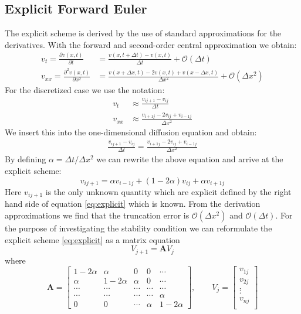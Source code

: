 \documentclass[%
 reprint,
nofootinbib,
aps,
]{revtex4-1}
\renewcommand{\vec}[1]{\mathbf{#1}} %
\begin{document}
\subsection{Explicit Forward Euler}
The explicit scheme is derived by the use of standard approximations for the derivatives. With the forward and second-order central approximation we obtain:
\begin{align*}
    v_t = \frac{\partial v(x,t)}{\partial t} &= \frac{v(x,t + \Delta t) - v(x,t)}{\Delta t} + \mathcal{O}(\Delta t)  \\
     v_{xx} = \frac{\partial^2 v(x,t)}{\partial x^2} &= \frac{v(x + \Delta x, t) - 2v(x,t) + v(x -\Delta x, t)}{\Delta x^2} + \mathcal{O}(\Delta x^2)
\end{align*}
For the discretized case we use the notation:
\begin{align*}
   v_t &\approx \frac{v_{ij+1} - v_{ij}}{\Delta t} \\
   v_{xx} &\approx \frac{v_{i+1j} - 2v_{ij} + v_{i-1j}}{\Delta x^2}
\end{align*}
We insert this into the one-dimensional diffusion equation and obtain:
\begin{align*}
    \frac{v_{ij+1} - v_{ij}}{\Delta t} = \frac{v_{i+1j} - 2v_{ij} + v_{i-1j}}{\Delta x^2}
\end{align*}
By defining $\alpha = \Delta t/\Delta x^2$ we can rewrite the above equation and arrive at the explicit scheme:
\begin{equation}
    v_{ij+1} = \alpha v_{i-1j} + (1-2\alpha)v_{ij} + \alpha v_{i+1j}
    \label{eq:explicit}
\end{equation}
Here $v_{ij+1}$ is the only unknown quantity which are explicit defined by the right hand side of equation \ref{eq:explicit} which is known. From the derivation approximations we find that the truncation error is $\mathcal{O}(\Delta x^2)$ and $\mathcal{O}(\Delta t)$. For the purpose of investigating the stability condition we can reformulate the explicit scheme \ref{eq:explicit} as a matrix equation $$V_{j+1} = \textbf{A} V_j$$ where
\begin{equation}
    \vec{A} = \begin{bmatrix}
                    1-2\alpha & \alpha & 0 & 0 & \cdots \\
                    \alpha & 1-2\alpha & \alpha & 0 & \cdots \\
                    \cdots & \cdots & \cdots & \cdots & \cdots \\
                    \cdots & \cdots & \cdots & \cdots & \alpha \\
                    0 & 0 & \cdots & \alpha & 1-2\alpha
    \end{bmatrix}
     , \qquad V_j =  \begin{bmatrix}
                        v_{1j} \\
                        v_{2j} \\
                        \vdots \\
                        v_{nj} \\
                    \end{bmatrix}
    \label{eq:A_Ex}
\end{equation}
\end{document}
